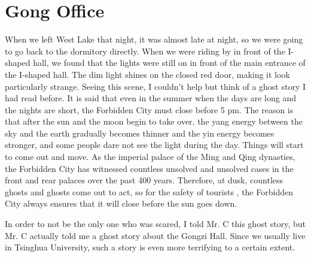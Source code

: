 \chapter{Gong Office}

When we left West Lake that night, it was almost late at night, so we were
going to go back to the dormitory directly.  When we were riding by in front of
the I-shaped hall, we found that the lights were still on in front of the main
entrance of the I-shaped hall. The dim light shines on the closed red door,
making it look particularly strange.  Seeing this scene, I couldn't help but
think of a ghost story I had read before.  It is said that even in the summer
when the days are long and the nights are short, the Forbidden City must close
before 5 pm. The reason is that after the sun and the moon begin to take over,
the yang energy between the sky and the earth gradually becomes thinner and the
yin energy becomes stronger, and some people dare not see the light during the
day. Things will start to come out and move.  As the imperial palace of the
Ming and Qing dynasties, the Forbidden City has witnessed countless unsolved
and unsolved cases in the front and rear palaces over the past 400 years.
Therefore, at dusk, countless ghosts and ghosts come out to act, so for the
safety of tourists , the Forbidden City always ensures that it will close
before the sun goes down.

In order to not be the only one who was scared, I told Mr. C this ghost story,
but Mr. C actually told me a ghost story about the Gongzi Hall.  Since we
usually live in Tsinghua University, such a story is even more terrifying to a
certain extent.

